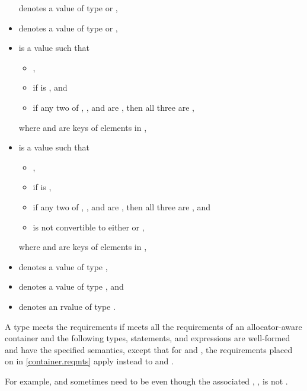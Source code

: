 \begin{itemize}
 denotes a value of type  or ,
\item
{} denotes a value of type  or ,
\item
{} is a value such that
  \begin{itemize}
  \item {},
  \item {} if  is , and
  \item if any two of
    , , and 
    are , then all three are ,
  \end{itemize}
  where  and  are keys of elements in ,
\item
{} is a value such that
  \begin{itemize}
  \item {},
  \item {} if  is ,
  \item if any two of
    , , and 
    are , then all three are , and
  \item {} is not convertible to
    either  or ,
  \end{itemize}
  where  and  are keys of elements in ,
\item
{} denotes a value of type ,
\item
{} denotes a value of type , and
\item
{} denotes an rvalue of type .
\end{itemize}

\pnum
A type  meets
the  requirements
if  meets all the requirements of
an allocator-aware container and
the following types, statements, and expressions are well-formed and
have the specified semantics,
except that for  and ,
the requirements placed on  in \ref{container.reqmts}
apply instead to  and .
\begin{note}
For example,  and 
sometimes need to be 
even though the associated ,
,
is not .
\end{note}

